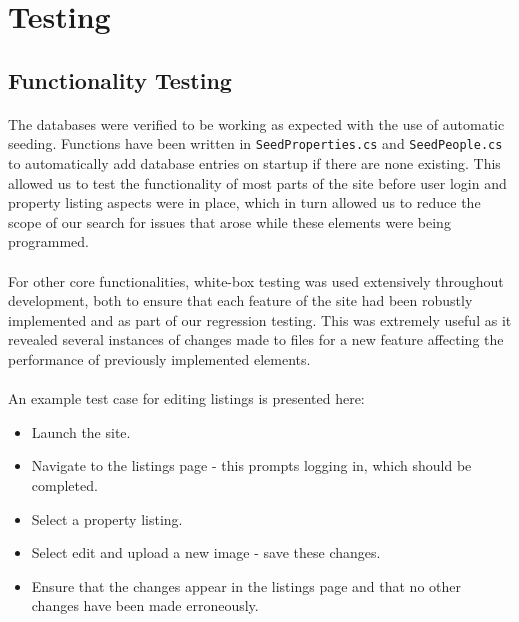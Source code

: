 \documentclass{article}
\begin{document}
\FloatBarrier
\section{Testing}
    \subsection{Functionality Testing}
        \paragraph{}
            The databases were verified to be working as expected with the use of automatic seeding.
            Functions have been written in \texttt{SeedProperties.cs} and \texttt{SeedPeople.cs} to automatically add database entries on startup if there are none existing.
            This allowed us to test the functionality of most parts of the site before user login and property listing aspects were in place, which in turn allowed us to reduce the scope of our search for issues that arose while these elements were being programmed.

        \paragraph{}
            For other core functionalities, white-box testing was used extensively throughout development, both to ensure that each feature of the site had been robustly implemented and as part of our regression testing.
            This was extremely useful as it revealed several instances of changes made to files for a new feature affecting the performance of previously implemented elements.

        \paragraph{}

        \paragraph{}
            An example test case for editing listings is presented here:

            \begin{itemize}\itemsep 0pt
                \item Launch the site.
                \item Navigate to the listings page - this prompts logging in, which should be completed.
                \item Select a property listing.
                \item Select edit and upload a new image - save these changes.
                \item Ensure that the changes appear in the listings page and that no other changes have been made erroneously.
            \end{itemize}
\end{document}
